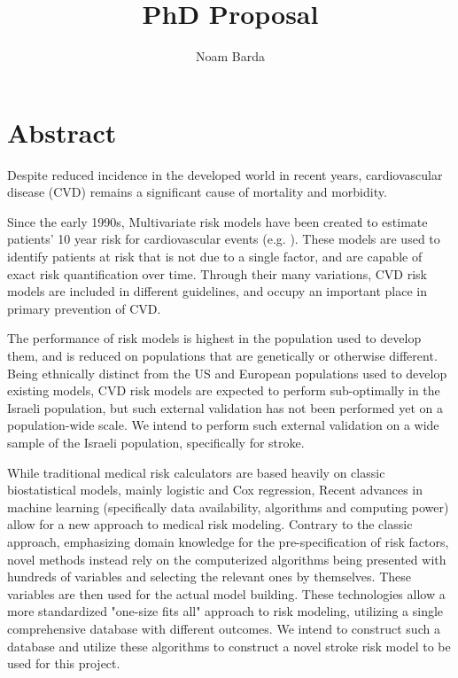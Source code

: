 \documentclass[a4paper,12pt]{article}
\begin{document}
	
	\title{PhD Proposal}
	\author{Noam Barda}
	\maketitle
	
	\section{Abstract}
	Despite reduced incidence in the developed world in recent years\cite{Koton2014,Vangen-Loenne2017}, cardiovascular disease (CVD) remains a significant cause of mortality and morbidity\cite{ODonnell2016}.
	
	Since the early 1990s, Multivariate risk models have been created to estimate patients' 10 year risk for cardiovascular events (e.g. \cite{Wilson1998,Conroy2003,DAgostino2008}). These models are used to identify patients at risk that is not due to a single factor, and are capable of exact risk quantification over time\cite{Goff2014}. Through their many variations, CVD risk models are included in different guidelines, and occupy an important place in primary prevention of CVD\cite{Graham2007,Goff2014}.
	
	The performance of risk models is highest in the population used to develop them, and is reduced on populations that are genetically or otherwise different\cite{DAgostino2001,Bastuji-Garin2002,DeFilippis2015}. Being ethnically distinct from the US and European populations used to develop existing models, CVD risk models are expected to perform sub-optimally in the Israeli population, but such external validation has not been performed yet on a population-wide scale\cite{Lovis2015}. We intend to perform such external validation on a wide sample of the Israeli population, specifically for stroke.
	
	While traditional medical risk calculators are based heavily on classic biostatistical models, mainly logistic and Cox regression, Recent advances in machine learning (specifically data availability, algorithms and computing power) allow for a new approach to medical risk modeling\cite{Obermeyer2016}. Contrary to the classic approach, emphasizing domain knowledge for the pre-specification of risk factors, novel methods instead rely on the computerized algorithms being presented with hundreds of variables and selecting the relevant ones by themselves. These variables are then used for the actual model building\cite{Weng2017}. These technologies allow a more standardized "one-size fits all" approach to risk modeling, utilizing a single comprehensive database with different outcomes\cite{Rajkomar2018}. We intend to construct such a database and utilize these algorithms to construct a novel stroke risk model to be used for this project.
	
\end{document}
